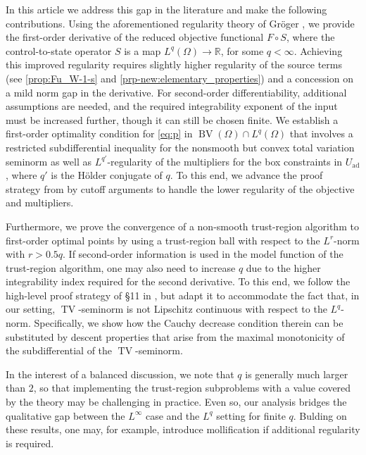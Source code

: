 \documentclass[11pt]{article}
\newcommand{\R}{\mathbb{R}}
\DeclareMathOperator*{\BV}{BV}
\DeclareMathOperator*{\TV}{TV}
\newcommand{\feas}{U_{\textrm{ad}}}
\theoremstyle{definition}
\theoremstyle{remark}
\begin{document}
In this article we address this gap in the literature and make the following contributions.
Using the aforementioned regularity theory of Gröger \cite{groger1989aw}, 
we provide the first-order derivative of the reduced objective functional
$F \circ S$, where the control-to-state operator $S$ is a map $L^q(\Omega) \to \R$, for some $q < \infty$. Achieving this improved regularity requires
 slightly higher regularity of the
source terms (see \cref{prop:Fu_W-1-s} and \cref{prp-new:elementary_properties})
and a concession on a mild norm gap in the derivative. For second-order differentiability, additional assumptions are needed, and the required integrability exponent of the input must be increased further, though it can still be chosen finite.
We establish a first-order optimality condition for \eqref{eq:p} in $\BV(\Omega) \cap L^q(\Omega)$ that involves a 
restricted subdifferential inequality for the nonsmooth but convex total variation 
seminorm as well as $L^{q'}$-regularity of the multipliers for the box constraints in 
$\feas$, where $q'$ is the H\"older conjugate of $q$. To this end, we advance the 
proof strategy from \cite{natemeyer2022penalty} by cutoff arguments to handle the 
lower regularity of the objective and multipliers. 

Furthermore, we prove the  convergence of a  non-smooth trust-region algorithm to 
first-order optimal points by using a trust-region ball with respect to the 
$L^r$-norm with $r > 0.5 q$. If second-order information is
used in the model function of the trust-region algorithm, one may also need to 
increase $q$ due to the higher integrability index required for the second derivative.
To this end, we follow the high-level proof strategy of \S11 in \cite{conn2000trust}, but adapt it to accommodate the fact that, in our setting, $\TV$-seminorm  is not Lipschitz continuous with respect to the  $L^q$-norm.
Specifically, we show how the Cauchy decrease condition 
therein can be substituted by descent properties that arise from the maximal 
monotonicity of the subdifferential of the $\TV$-seminorm.

In the interest of a balanced discussion, we note that $q$
is generally much larger than $2$, so that implementing the trust-region subproblems with a value
covered by the theory may be challenging in practice. Even so, our analysis bridges the
qualitative gap between the $L^\infty$ case and the  $L^q$ setting for finite 
$q$. Bulding on these results, one may, for example, introduce
mollification if additional regularity is required.
\end{document}
